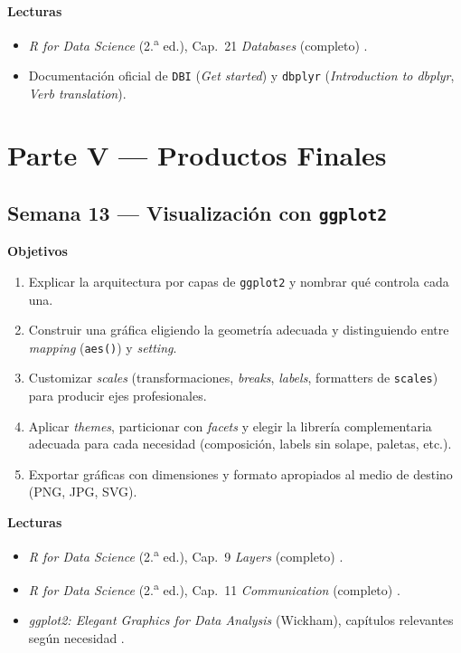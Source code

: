 \documentclass[11pt,letterpaper]{article}
\newcommand{\semanaSucinta}[2]{%
  \subsection*{\color{main}Semana #1 --- #2}%
}
\begin{document}
\noindent\textbf{Lecturas}
\begin{itemize}[leftmargin=*, itemsep=1pt]
    \item \textit{R for Data Science} (2.\textsuperscript{a} ed.), Cap.\ 21 \textit{Databases} (completo) \cite{wickham2023r4ds}.
    \item Documentación oficial de \texttt{DBI} (\textit{Get started}) y \texttt{dbplyr} (\textit{Introduction to dbplyr}, \textit{Verb translation}).
\end{itemize}

\section*{\color{main}Parte V --- Productos Finales}

\semanaSucinta{13}{Visualización con \texttt{ggplot2}}

\noindent\textbf{Objetivos}
\begin{enumerate}[leftmargin=*, itemsep=1pt]
    \item Explicar la arquitectura por capas de \texttt{ggplot2} y nombrar qué controla cada una.
    \item Construir una gráfica eligiendo la geometría adecuada y distinguiendo entre \textit{mapping} (\texttt{aes()}) y \textit{setting}.
    \item Customizar \textit{scales} (transformaciones, \textit{breaks}, \textit{labels}, formatters de \texttt{scales}) para producir ejes profesionales.
    \item Aplicar \textit{themes}, particionar con \textit{facets} y elegir la librería complementaria adecuada para cada necesidad (composición, labels sin solape, paletas, etc.).
    \item Exportar gráficas con dimensiones y formato apropiados al medio de destino (PNG, JPG, SVG).
\end{enumerate}

\noindent\textbf{Lecturas}
\begin{itemize}[leftmargin=*, itemsep=1pt]
    \item \textit{R for Data Science} (2.\textsuperscript{a} ed.), Cap.\ 9 \textit{Layers} (completo) \cite{wickham2023r4ds}.
    \item \textit{R for Data Science} (2.\textsuperscript{a} ed.), Cap.\ 11 \textit{Communication} (completo) \cite{wickham2023r4ds}.
    \item \textit{ggplot2: Elegant Graphics for Data Analysis} (Wickham), capítulos relevantes según necesidad \cite{wickham2016ggplot2}.
\end{itemize}
\end{document}
